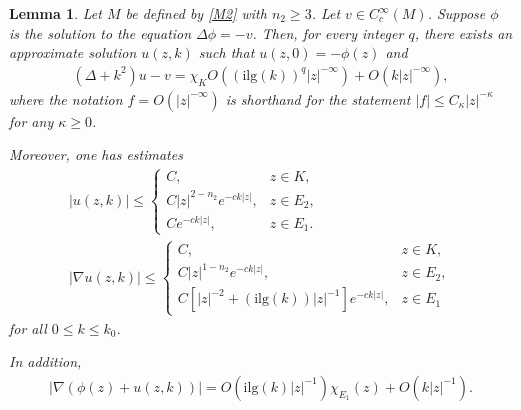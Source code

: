 \documentclass[12pt]{amsart}
\newtheorem{lemma}[theorem]{Lemma}
\newtheorem{remark}[theorem]{Remark}
\begin{document}
\begin{lemma}\cite[Lemma~2.14]{HNS}\label{keylemma_HNS}
Let $M$ be defined by \eqref{M2} with $n_2\ge 3$. Let $v \in C_c^{\infty}(M)$. Suppose $\phi$ is the solution to the equation $\Delta \phi = -v$. Then, for every integer $q$, there  exists an approximate solution $u(z,k)$ such that $u(z,0)=-\phi(z)$ and
\begin{align*}
    (\Delta + k^2)u - v = \chi_{K} O((\textrm{ilg}(k))^q |z|^{-\infty}) + O(k |z|^{-\infty}),
\end{align*}
where the notation $f = O(|z|^{-\infty})$ is shorthand for the statement $|f|\le C_\kappa |z|^{-\kappa}$ for any $\kappa \ge 0$. 

Moreover, one has estimates
\begin{gather*}
|u(z, k)| \le \begin{cases}
    C, & z\in K,\\
    C |z|^{2-n_2} e^{- ck |z|}, & z \in  E_2,\\
    C e^{-ck |z|}, & z \in E_1.
\end{cases}\\  
|\nabla u(z, k)| \le \begin{cases}
    C, & z\in K,\\
    C |z|^{1-n_2} e^{- ck |z|}, & z \in  E_2,\\
    C \left[|z|^{-2} + (\textrm{ilg}(k))|z|^{-1}\right] e^{-ck|z|}, & z \in E_1
\end{cases}
\end{gather*}
for all $0\le k\le k_0$.

In addition, 
\begin{align}\label{deri1}
|\nabla \left(\phi(z)+u(z,k)\right)| = O(\textrm{ilg}(k)|z|^{-1}) \chi_{E_1}(z) + O(k|z|^{-1}).    
\end{align}

\end{lemma}

\end{document}
